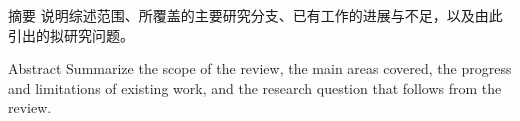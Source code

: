 \begin{MasterAbstract}{摘\quad 要}
说明综述范围、所覆盖的主要研究分支、已有工作的进展与不足，以及由此引出的拟研究问题。

\end{MasterAbstract}

\begin{MasterAbstract}{Abstract}
Summarize the scope of the review, the main areas covered, the progress and limitations of existing work, and the research question that follows from the review.

\end{MasterAbstract}
